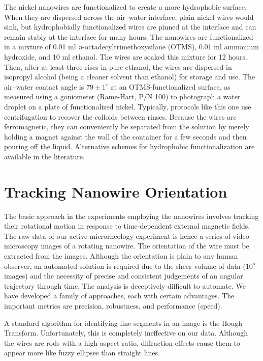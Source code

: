 The nickel nanowires are functionalized to create a more hydrophobic surface. When they are dispersed across the air--water interface, plain nickel wires would sink, but hydrophobially functionalized wires are pinned at the interface and can remain stably at the interface for many hours. The nanowires are functionalized in a mixture of 0.01 ml \emph{n}-octadecyltrimethoxysilane (OTMS), 0.01 ml ammonium hydroxide, and 10 ml ethanol. The wires are soaked this mixture for 12 hours. Then, after at least three rises in pure ethanol, the wires are dispersed in isopropyl alcohol (being a cleaner solvent than ethanol) for storage and use. The air--water contact angle is $79 \pm 1^\circ$ at an OTMS-functionalized surface, as measured using a goniometer (Rame-Hart, P/N 100)\cite{Lee2010} to photograph a water droplet on a plate of functionalized nickel. Typically, protocols like this one use centrifugation to recover the colloids between rinses. Because the wires are ferromagnetic, they can conveniently be separated from the solution by merely holding a magnet against the wall of the container for a few seconds and then pouring off the liquid. Alternative schemes for hydrophobic functionalization are available in the literature\cite{Sugimura2002,Fond2007}.

\section{Tracking Nanowire Orientation}

The basic approach in the experiments employing the nanowires involves tracking their rotational motion in response to time-dependent external magnetic fields. The raw data of our active microrheology experiment is hence a series of video microscopy images of a rotating nanowire. The orientation of the wire must be extracted from the images. Although the orientation is plain to any human observer, an automated solution is required due to the sheer volume of data ($10^5$ images) and the necessity of precise and consistent judgements of an angular trajectory through time. The analysis is deceptively difficult to automate. We have developed a family of approaches, each with certain advantages. The important metrics are precision, robustness, and performance (speed).

A standard algorithm for identifying line segments in an image is the Hough Transform. Unfortunately, this is completely ineffective on our data. Although the wires are rods with a high aspect ratio, diffraction effects cause them to appear more like fuzzy ellipses than straight lines.

